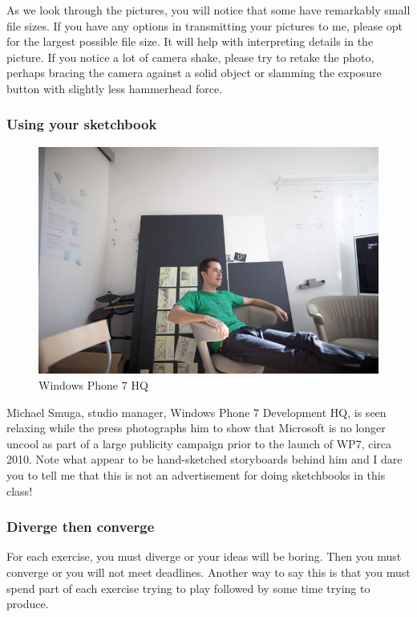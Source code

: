 As we look through the pictures, you will notice that some have
remarkably small file sizes. If you have any options in transmitting
your pictures to me, please opt for the largest possible file size. It
will help with interpreting details in the picture. If you notice a lot
of camera shake, please try to retake the photo, perhaps bracing the
camera against a solid object or slamming the exposure button with
slightly less hammerhead force.

\hypertarget{using-your-sketchbook}{%
\subsubsection{Using your sketchbook}\label{using-your-sketchbook}}

\begin{figure}
\centering
\includegraphics{./fiWP7hq.jpg}
\caption{Windows Phone 7 HQ}
\end{figure}

Michael Smuga, studio manager, Windows Phone 7 Development HQ, is seen
relaxing while the press photographs him to show that Microsoft is no
longer uncool as part of a large publicity campaign prior to the launch
of WP7, circa 2010. Note what appear to be hand-sketched storyboards
behind him and I dare you to tell me that this is not an advertisement
for doing sketchbooks in this class!

\hypertarget{diverge-then-converge-1}{%
\subsubsection{Diverge then converge}\label{diverge-then-converge-1}}

For each exercise, you must diverge or your ideas will be boring. Then
you must converge or you will not meet deadlines. Another way to say
this is that you must spend part of each exercise trying to play
followed by some time trying to produce.

